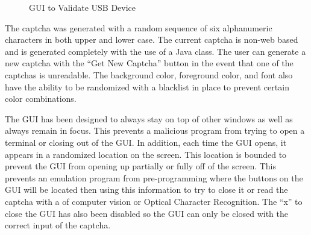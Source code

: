 \documentclass[pagenumbers]{ieee}
\begin{document}
\begin{figure}[H]
	\caption{GUI to Validate USB Device}
	\label{fig:JavaGUI}
\end{figure}

The captcha was generated with a random sequence of six alphanumeric characters in both upper and lower case. The current captcha is non-web based and is generated completely with the use of a Java class. The user can generate a new captcha with the ``Get New Captcha'' button in the event that one of the captchas is unreadable. The background color, foreground color, and font also have the ability to be randomized with a blacklist in place to prevent certain color combinations.

The GUI has been designed to always stay on top of other windows as well as always remain in focus. This prevents a malicious program from trying to open a terminal or closing out of the GUI. In addition, each time the GUI opens, it appears in a randomized location on the screen. This location is bounded to prevent the GUI from opening up partially or fully off of the screen. This prevents an emulation program from pre-programming where the buttons on the GUI will be located then using this information to try to close it or read the captcha with a of computer vision or Optical Character Recognition. The ``x'' to close the GUI has also been disabled so the GUI can only be closed with the correct input of the captcha.
\end{document}
